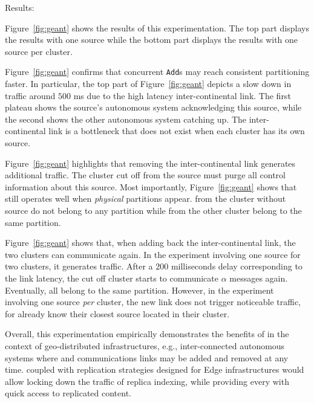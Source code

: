 \begin{asparadesc}
\item [Results:]

Figure~\ref{fig:geant} shows the results of this experimentation. The
top part displays the results with one source while the bottom part
displays the results with one source per cluster.

\noindent Figure~\ref{fig:geant} confirms that concurrent
\texttt{Add}s may reach consistent partitioning faster. In particular,
the top part of Figure~\ref{fig:geant} depicts a slow down in traffic
around $500$ ms due to the high latency inter-continental link. The
first plateau shows the source's autonomous system acknowledging this
source, while the second shows the other autonomous system catching
up.  The inter-continental link is a bottleneck that does not exist
when each cluster has its own source.

\noindent Figure~\ref{fig:geant} highlights that removing the
inter-continental link generates additional traffic. The cluster cut
off from the source must purge all control information about this
source.  Most importantly, Figure~\ref{fig:geant} shows that \NAME
still operates well when \emph{physical} partitions appear. \Processes
from the cluster without source do not belong to any partition while
\processes from the other cluster belong to the same partition. 

\noindent Figure~\ref{fig:geant} shows that, when adding back the
inter-continental link, the two clusters can communicate again. In the
experiment involving one source for two clusters, it generates
traffic. After a $200$ milliseconds delay corresponding to the link
latency, the cut off cluster starts to communicate $\alpha$ messages
again. Eventually, all \processes belong to the same
partition. However, in the experiment involving one source \emph{per}
cluster, the new link does not trigger noticeable traffic, for
\processes already know their closest source located in their cluster.

\noindent Overall, this experimentation empirically demonstrates the
benefits of \NAME in the context of geo-distributed infrastructures,
e.g., inter-connected autonomous systems where \processes and
communications links may be added and removed at any time. \NAME
coupled with replication strategies designed for Edge infrastructures
would allow locking down the traffic of replica indexing, while
providing every \process with quick access to replicated content.

\end{asparadesc}

